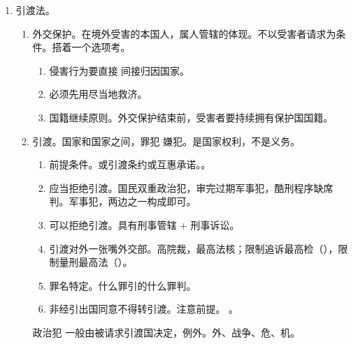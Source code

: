 \begin{enumerate}
\begin{enumerate}
\begin{enumerate}
\begin{enumerate}
                          \item 限期出境。个案问题不具有可考性。
                          \item 遣送出境。县以上公安 \hz 边检、1 到 5 年不得入境。
                          \item 驱逐出境。公安部、10 年不得入境。
                        \end{enumerate}
                \end{enumerate}
        \end{enumerate}
  \item 引渡法。
        \begin{enumerate}
          \item 外交保护。在境外受害的本国人，属人管辖的体现。不以受害者请求为条件。搭着一个选项考。
                \begin{enumerate}
                  \item 侵害行为要直接 \hz 间接归因国家。
                  \item 必须先用尽当地救济。
                  \item 国籍继续原则。外交保护结束前，受害者要持续拥有保护国国籍。
                \end{enumerate}
          \item 引渡。国家和国家之间，罪犯 \hz 嫌犯。是国家权利，不是义务。
                \begin{enumerate}
                  \item 前提条件。或引渡条约或互惠承诺。。
                  \item 应当拒绝引渡。国民双重政治犯，审完过期军事犯，酷刑程序缺席判。军事犯，两边之一构成即可。
                  \item 可以拒绝引渡。具有刑事管辖 + 刑事诉讼。
                  \item 引渡对外一张嘴外交部。高院裁，最高法核；限制追诉最高检（），限制量刑最高法（）。
                  \item 罪名特定。什么罪引的什么罪判。
                  \item 非经引出国同意不得转引渡。注意前提。
                        。
                \end{enumerate}
                \begin{kk}{政治犯}
                  一般由被请求引渡国决定，例外。外、战争、危、机。

\end{kk}
\end{enumerate}
\end{enumerate}
